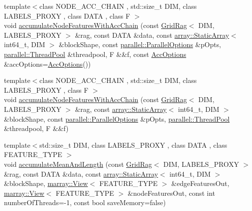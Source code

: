 \begin{DoxyCompactItemize}
\item 
{\footnotesize template$<$class N\+O\+D\+E\+\_\+\+A\+C\+C\+\_\+\+C\+H\+A\+I\+N , std\+::size\+\_\+t D\+I\+M, class L\+A\+B\+E\+L\+S\+\_\+\+P\+R\+O\+X\+Y , class D\+A\+T\+A , class F $>$ }\\void \hyperlink{namespacenifty_1_1graph_a2cfa949da8b5193deb5fb6d898154e23}{accumulate\+Node\+Features\+With\+Acc\+Chain} (const \hyperlink{classnifty_1_1graph_1_1GridRag}{Grid\+Rag}$<$ D\+I\+M, L\+A\+B\+E\+L\+S\+\_\+\+P\+R\+O\+X\+Y $>$ \&rag, const D\+A\+T\+A \&data, const \hyperlink{namespacenifty_1_1array_a683f151f19c851754e0c6d55ed16a0c2}{array\+::\+Static\+Array}$<$ int64\+\_\+t, D\+I\+M $>$ \&block\+Shape, const \hyperlink{classnifty_1_1parallel_1_1ParallelOptions}{parallel\+::\+Parallel\+Options} \&p\+Opts, \hyperlink{classnifty_1_1parallel_1_1ThreadPool}{parallel\+::\+Thread\+Pool} \&threadpool, F \&\&f, const \hyperlink{structnifty_1_1graph_1_1AccOptions}{Acc\+Options} \&acc\+Options=\hyperlink{structnifty_1_1graph_1_1AccOptions}{Acc\+Options}())
\item 
{\footnotesize template$<$class N\+O\+D\+E\+\_\+\+A\+C\+C\+\_\+\+C\+H\+A\+I\+N , std\+::size\+\_\+t D\+I\+M, class L\+A\+B\+E\+L\+S\+\_\+\+P\+R\+O\+X\+Y , class F $>$ }\\void \hyperlink{namespacenifty_1_1graph_a1464a1e4da963bdaf932c41c042f734e}{accumulate\+Node\+Features\+With\+Acc\+Chain} (const \hyperlink{classnifty_1_1graph_1_1GridRag}{Grid\+Rag}$<$ D\+I\+M, L\+A\+B\+E\+L\+S\+\_\+\+P\+R\+O\+X\+Y $>$ \&rag, const \hyperlink{namespacenifty_1_1array_a683f151f19c851754e0c6d55ed16a0c2}{array\+::\+Static\+Array}$<$ int64\+\_\+t, D\+I\+M $>$ \&block\+Shape, const \hyperlink{classnifty_1_1parallel_1_1ParallelOptions}{parallel\+::\+Parallel\+Options} \&p\+Opts, \hyperlink{classnifty_1_1parallel_1_1ThreadPool}{parallel\+::\+Thread\+Pool} \&threadpool, F \&\&f)
\item 
{\footnotesize template$<$std\+::size\+\_\+t D\+I\+M, class L\+A\+B\+E\+L\+S\+\_\+\+P\+R\+O\+X\+Y , class D\+A\+T\+A , class F\+E\+A\+T\+U\+R\+E\+\_\+\+T\+Y\+P\+E $>$ }\\void \hyperlink{namespacenifty_1_1graph_afa27dafc0727ab9fb2d7e5e5fa23996b}{accumulate\+Mean\+And\+Length} (const \hyperlink{classnifty_1_1graph_1_1GridRag}{Grid\+Rag}$<$ D\+I\+M, L\+A\+B\+E\+L\+S\+\_\+\+P\+R\+O\+X\+Y $>$ \&rag, const D\+A\+T\+A \&data, const \hyperlink{namespacenifty_1_1array_a683f151f19c851754e0c6d55ed16a0c2}{array\+::\+Static\+Array}$<$ int64\+\_\+t, D\+I\+M $>$ \&block\+Shape, \hyperlink{classandres_1_1View}{marray\+::\+View}$<$ F\+E\+A\+T\+U\+R\+E\+\_\+\+T\+Y\+P\+E $>$ \&edge\+Features\+Out, \hyperlink{classandres_1_1View}{marray\+::\+View}$<$ F\+E\+A\+T\+U\+R\+E\+\_\+\+T\+Y\+P\+E $>$ \&node\+Features\+Out, const int number\+Of\+Threads=-\/1, const bool save\+Memory=false)

\end{DoxyCompactItemize}
